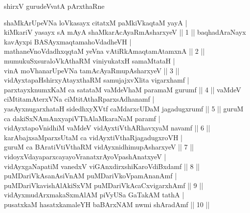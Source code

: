 \thispagestyle{empty}
\centerline{\large shirxV gurudeVvatA pArxthaRne}
\vfill\noindent
\noindent
shaMkArUpeVNa loVkasayx citatxM paMkiVkaqtaM yayA |\\
kiMkariV yasayx sA mAyA shaMkarAcAyaRmAsharxyeV || 1 ||
\vfill\noindent
baqhadAraNayx kavAyxpi BASAyxmaqtamahoVdadheVH |\\
mathaneVnoVdadhxqqtaM yeVna vAtiRkAmaqtamAtamxnA || 2 ||
\vfill\noindent
mumukuSxsuraloVkAthaRM viniyukatxH samaMtataH |\\
vinA moVhanarUpeVNa tamAcAyaRmupAsharxyeV || 3 ||
\vfill\noindent
vidAyxtapaHshirxyAtayxthaRM samujajxvXlita vigarxhamf |\\
parxtayxknumxKaM ca satataM vaMdeV\s haM paramaM gurumf || 4 ||
\vfill\noindent
vaMdeV ciMtitamAterxVNa ciMtitAthaRparxsAdhanamf |\\
yasAyxnugarxhataH sidedhxyXVtf caMdarxcUDaM jagadugxrumf || 5 ||
\vfill\noindent
guruM ca dakiSxNAmAnxyapiVThAlaMkaraNaM paramf |\\
vidAyxtapoVnidhiM vaMdeV vidAyxtiVthARhavxyaM navamf || 6 ||
\vfill\noindent
karAbajxsaMparxsUtaM ca vidAyxtiVthaRjagadugxroVH |\\
guruM ca BAratiVtiVthaRM vidAyxnidhimupAsharxyeV || 7 ||
\vfill\noindent
vidoyxVdayaparxcayayoVranatxrAyoVpashAnatxyeV |\\
vidAyxgaNapatiM vanedxV viGAnxdirxshiKaroVdiBxdamf || 8 ||
\vfill\noindent
puMDariVkAsanAsiVnAM puMDariVkoVpamAnanAmf |\\
puMDariVkavishAlAkiSxVM puMDariVkAcaCxvigarxhAmf || 9 ||
\vfill\noindent
vidAyxmudArxmakaSxmAlAM piVyUSa GaTakAM tathA |\\
pusatxkaM hasatxkamaleYH baBArxNAM nwmi shAradAmf || 10 ||

